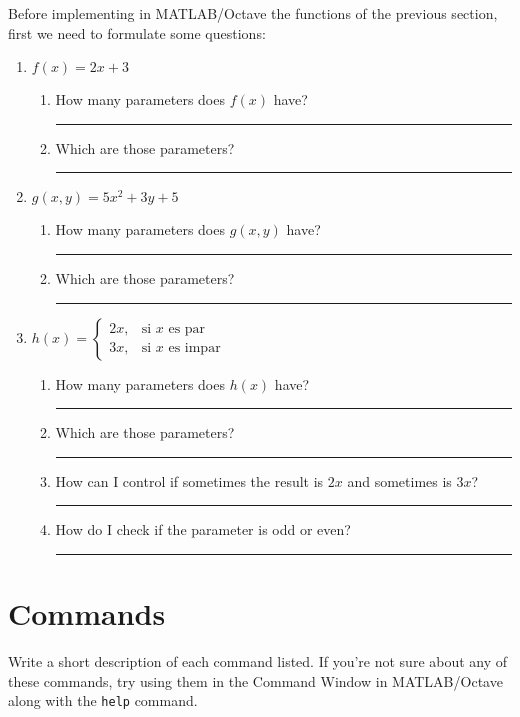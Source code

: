 \documentclass[spanish, 10pt]{article}
\newcommand{\shortresponserule}{{\large\rule{5 cm}{0.3mm}}}
\newcommand{\matlab}[1]{\lstinline[style=Matlab-pyglike]!#1!}
\begin{document}
Before implementing in MATLAB/Octave the functions of the previous section, first we need to formulate some questions:

\begin{enumerate}
	\item $f(x) = 2x + 3$
	\begin{enumerate}
        \item How many parameters does $f(x)$ have? \hfill \shortresponserule
        \item Which are those parameters? \hfill \shortresponserule
    \end{enumerate}
	\item $g(x,y) = 5x^2 + 3y + 5$
	\begin{enumerate}
        \item How many parameters does $g(x,y)$ have? \hfill \shortresponserule
        \item Which are those parameters? \hfill \shortresponserule
    \end{enumerate}
	\item $h(x) =
    \begin{cases}
        2x, & \text{si } x \text{ es par} \\
        3x, & \text{si } x \text{ es impar}
    \end{cases}$
    \begin{enumerate}
        \item How many parameters does $h(x)$ have? \hfill \shortresponserule
        \item Which are those parameters? \hfill \shortresponserule
        \item How can I control if sometimes the result is $2x$ and sometimes is $3x$? \hfill \shortresponserule
        \item How do I check if the parameter is odd or even? \hfill \shortresponserule
    \end{enumerate}
\end{enumerate}

\section{Commands}

Write a short description of each command listed.
If you're not sure about any of these commands, try using them in the Command Window in MATLAB/Octave along with the \matlab{help} command.

\vspace{3ex}
\end{document}
